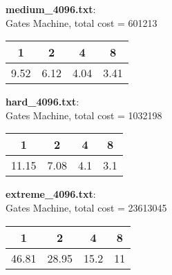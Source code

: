 \documentclass[11pt]{article}
\begin{document}
\textbf{medium\_4096.txt}:\\ Gates Machine, total cost = 601213
\begin{table}[h!]
\centering
\label{tab:perf-medium}
\begin{tabular}{|c|c|c|c|}
\hline
1 & 2 & 4 & 8 \\
\hline
9.52 & 6.12 & 4.04 & 3.41 \\
\hline
\end{tabular}
\end{table}

\textbf{hard\_4096.txt}:\\ Gates Machine, total cost = 1032198
\begin{table}[h!]
\centering
\label{tab:perf-hard}
\begin{tabular}{|c|c|c|c|}
\hline
1 & 2 & 4 & 8 \\
\hline
11.15 & 7.08 & 4.1 & 3.1 \\
\hline
\end{tabular}
\end{table}
\newpage
\textbf{extreme\_4096.txt}:\\ Gates Machine, total cost = 23613045
\begin{table}[h!]
\centering
\label{tab:perf-extreme}
\begin{tabular}{|c|c|c|c|}
\hline
1 & 2 & 4 & 8 \\
\hline
46.81 & 28.95 & 15.2 & 11 \\
\hline
\end{tabular}
\end{table}
\end{document}
